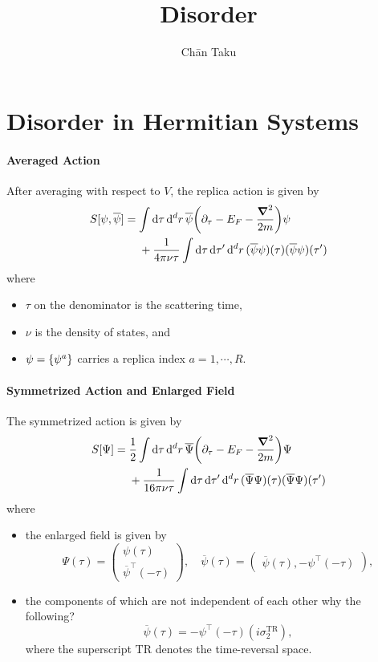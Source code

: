 \documentclass{article}
\title{Disorder}
\author{Ch\=an Taku}
\begin{document}
\maketitle

\section{Disorder in Hermitian Systems}

\paragraph*{Averaged Action}
After averaging with respect to $V$, the replica action is given by
\begin{align*}
    S[\psi,\overline{\psi}] &= \int \dd{\tau} \dd[d]{r} \overline{\psi}\qty(\partial_\tau - E_F - \frac{\grad^2}{2m}) \psi \\
    &{\phantom{{}={}}} + \frac{1}{4\pi \nu \tau} \int \dd{\tau} \dd{\tau'}\dd[d]{r} (\overline{\psi}\psi)(\tau)(\overline{\psi}\psi)(\tau')
\end{align*}
where
\begin{itemize}
    \item $\tau$ on the denominator is the scattering time,
    \item $\nu$ is the density of states, and
    \item $\psi = \qty{\psi^a}$ carries a replica index $a = 1,\cdots,R$.
\end{itemize}

\paragraph*{Symmetrized Action and Enlarged Field}
The symmetrized action is given by
\begin{align}
    S[\Psi] &= \frac{1}{2} \int \dd{\tau} \dd[d]{r} \overline{\Psi} \qty(\partial_\tau - E_F - \frac{\grad^2}{2m}) \Psi \\
    \label{eq:action_enlarged}
    &{\phantom{{}={}}} + \frac{1}{16\pi\nu\tau} \int \dd{\tau}\dd{\tau'} \dd[d]{r} (\overline{\Psi}\Psi)(\tau) (\overline{\Psi}\Psi)(\tau')
\end{align}
where
\begin{itemize}
    \item the enlarged field is given by
    \[ \Psi(\tau) = \begin{pmatrix}
        \psi(\tau) \\ \overline{\psi}^\intercal(-\tau)
    \end{pmatrix},\quad \overline{\psi}(\tau) = \begin{pmatrix}
        \overline{\psi}(\tau), -\psi^\intercal(-\tau)
    \end{pmatrix}, \]
    \item the components of which are not independent of each other {\color{red}why the following?}
    \begin{equation*}
        \label{eq:psi_bar_relation}
        \overline{\psi}(\tau) = -\psi^\intercal(-\tau)(i\sigma_2^{\mathrm{TR}}),
    \end{equation*}
    where the superscript $\mathrm{TR}$ denotes the time-reversal space.
\end{itemize}
\end{document}
